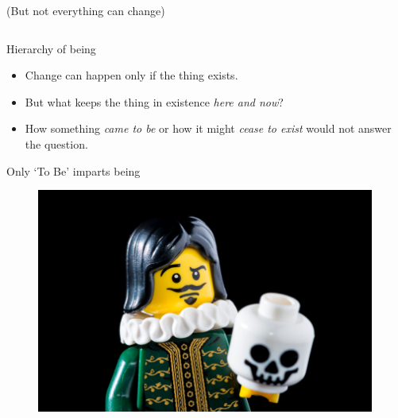 \documentclass[xcolor=dvipsnames]{beamer}
\begin{document}
\begin{frame}{(But not everything can change)}
\begin{figure}
\begin{columns}
  \end{columns}
\end{figure}
\end{frame}


\begin{frame}[fragile]{Hierarchy of being}
  \begin{itemize}
  \item Change can happen only if the thing exists. \vspace{5mm}
  \item But what keeps the thing in existence \emph{here and now}? \vspace{5mm}
  \item How something \emph{came to be} or how it might \emph{cease to exist} would not answer the question. \vspace{5mm}
  \end{itemize}
\end{frame}


\begin{frame}{Only `To Be' imparts being}
\begin{figure}
  \centering
  \begin{columns}
    \centering
    \includegraphics[width=0.99\textwidth]{to_be}
  \end{columns}
\end{figure}
\end{frame}
\end{document}
